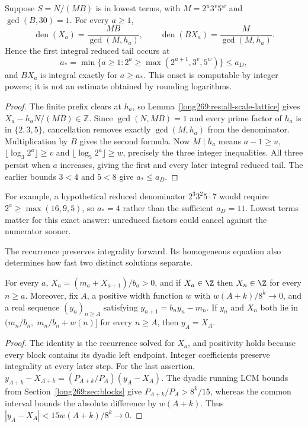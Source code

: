 \begin{proposition}
\label{long269:res:exact-denominator}
Suppose $S=N/(MB)$ is in lowest terms, with $M=2^u3^v5^w$ and
$\gcd(B,30)=1$.  For every $a\ge1$,
\[
 \operatorname{den}(X_a)=\frac{MB}{\gcd(M,h_a)},\qquad
 \operatorname{den}(BX_a)=\frac{M}{\gcd(M,h_a)}.
\]
Hence the first integral reduced tail occurs at
\[
 a_* =\min\{a\ge1:2^a\ge\max(2^{u+1},3^v,5^w)\}\le a_D,
\]
and $BX_a$ is integral exactly for $a\ge a_*$.  This onset is computable by
integer powers; it is not an estimate obtained by rounding logarithms.
\end{proposition}
\begin{proof}
The finite prefix clears at $h_a$, so Lemma~\ref{long269:res:all-scale-lattice} gives $X_a-h_aN/(MB)\in\mathbb Z$. Since $\gcd(N,MB)=1$ and every prime factor of $h_a$ is in $\{2,3,5\}$, cancellation removes exactly $\gcd(M,h_a)$ from the denominator. Multiplication by $B$ gives the second formula.
Now $M\mid h_a$ means
$a-1\ge u$, $\lfloor\log_3 2^a\rfloor\ge v$ and
$\lfloor\log_5 2^a\rfloor\ge w$, precisely the three integer inequalities.
All three persist when $a$ increases, giving the first and every later
integral reduced tail.  The earlier bounds $3<4$ and $5<8$ give $a_*\le a_D$.
\end{proof}
For example, a hypothetical reduced denominator $2^3 3^2 5\cdot7$ would
require $2^a\ge\max(16,9,5)$, so $a_*=4$ rather than the sufficient
$a_D=11$.  Lowest terms matter for this exact answer: unreduced factors
could cancel against the numerator sooner.

The recurrence preserves integrality forward.  Its homogeneous equation
also determines how fast two distinct solutions separate.

\begin{proposition}\label{long269:res:pinning}
For every $a$, $X_a=(m_a+X_{a+1})/b_a>0$, and if $X_a\in\Z$ then $X_n\in\Z$ for
every $n\ge a$.  Moreover, fix $A$, a positive width function $w$ with
$w(A+k)/8^{k}\to0$, and a real sequence $(y_n)_{n\ge A}$ satisfying
$y_{n+1}=b_ny_n-m_n$.  If $y_n$ and $X_n$ both lie in
$(m_n/b_n,\;m_n/b_n+w(n)]$ for every $n\ge A$, then $y_A=X_A$.
\end{proposition}

\begin{proof}
The identity is the recurrence solved for $X_a$, and positivity holds because
every block contains its dyadic left endpoint.  Integer coefficients preserve integrality at every later step.  For the last assertion,
$y_{A+k}-X_{A+k}=(P_{A+k}/P_A)(y_A-X_A)$.
The dyadic running LCM bounds from Section~\ref{long269:sec:blocks} give
$P_{A+k}/P_A>8^k/15$, whereas the common interval bounds the absolute
difference by $w(A+k)$.  Thus
$|y_A-X_A|<15w(A+k)/8^k\to0$.
\end{proof}

